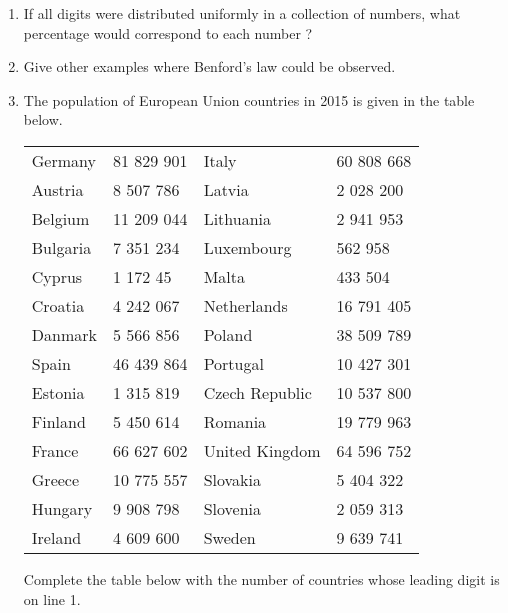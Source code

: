 \documentclass[12pt,a4paper,article]{nsi}
\begin{document}
\begin{enumerate}
    \item If all digits were distributed uniformly in a collection of numbers, what percentage would
          correspond to each number ?
    \item Give other examples where Benford’s law could be observed.
    \item The population of European Union countries in 2015 is given in the table below.
          \tabstyle[UGLiBlue]
          \begin{center}
              \begin{tabular}{l|l||||||||l|l}
                  Germany  & 81 829 901 & Italy          & 60 808 668 \\
                  Austria  & 8 507 786  & Latvia         & 2 028 200  \\
                  Belgium  & 11 209 044 & Lithuania      & 2 941 953  \\
                  Bulgaria & 7 351 234  & Luxembourg     & 562 958    \\
                  Cyprus   & 1 172 45   & Malta          & 433 504    \\
                  Croatia  & 4 242 067  & Netherlands    & 16 791 405 \\
                  Danmark  & 5 566 856  & Poland         & 38 509 789 \\
                  Spain    & 46 439 864 & Portugal       & 10 427 301 \\
                  Estonia  & 1 315 819  & Czech Republic & 10 537 800 \\
                  Finland  & 5 450 614  & Romania        & 19 779 963 \\
                  France   & 66 627 602 & United Kingdom & 64 596 752 \\
                  Greece   & 10 775 557 & Slovakia       & 5 404 322  \\
                  Hungary  & 9 908 798  & Slovenia       & 2 059 313  \\
                  Ireland  & 4 609 600  & Sweden         & 9 639 741
              \end{tabular}
          \end{center}
          Complete the table below with the number of countries whose leading digit is on line 1.


\end{enumerate}
\end{document}
